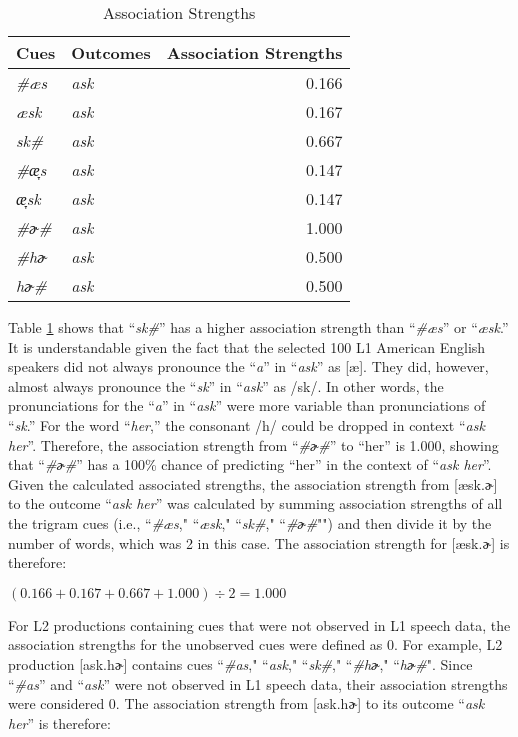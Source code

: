 \begin{table}[!h]
  \figSpace
  \centering
  \caption{Association Strengths}
    \begin{tabular}{llr}
 \toprule
    Cues & Outcomes  & Association Strengths \\
    \midrule
     \textit{\#æs}  & \textit{ask} & 0.166 \\
      \textit{æsk}  & \textit{ask} &0.167 \\
     \textit{sk\#}  & \textit{ask}&0.667 \\
     \textit{\#æ̞s} & \textit{ask} &0.147\\
     \textit{æ̞sk} & \textit{ask} &0.147\\
     \textit{\#ɚ\#}  & \textit{ask} & 1.000 \\
     \textit{\#hɚ}  & \textit{ask}&0.500 \\
     \textit{hɚ\#}  & \textit{ask} & 0.500 \\
    \bottomrule
    \end{tabular}%
  \label{tab:strength}%
    \figSpace
\end{table}%

Table \ref{tab:strength} shows that “\textit{sk\#}” has a higher association strength than “\textit{\#æs}” or “\textit{æsk}.” It is understandable given the fact that the selected 100 L1 American English speakers did not always pronounce the “\textit{a}” in “\textit{ask}” as [æ]. They did, however, almost always pronounce the “\textit{sk}” in “\textit{ask}” as /sk/. In other words, the pronunciations for the “\textit{a}” in “\textit{ask}” were more variable than pronunciations of “\textit{sk}.”  For the word “\textit{her},” the consonant /h/ could be dropped in context “\textit{ask her}”. Therefore, the association strength from “\textit{\#ɚ\#}” to “her” is 1.000, showing that “\textit{\#ɚ\#}” has a 100\% chance of predicting “her” in the context of “\textit{ask her}”. Given the calculated associated strengths, the association strength from [æsk.ɚ] to the outcome “\textit{ask her}” was calculated by summing association strengths of all the trigram cues (i.e., ``\textit{\#æs}," ``\textit{æsk}," ``\textit{sk\#}," ``\textit{\#ɚ\#}"") and then divide it by the number of words, which was 2 in this case. The association strength for [æsk.ɚ] is therefore:

$(0.166+0.167+0.667+1.000)\div 2 = 1.000 $

For L2 productions containing cues that were not observed in L1 speech data, the association strengths for the unobserved cues were defined as 0. For example, L2 production [ask.hɚ] contains cues ``\textit{\#as}," ``\textit{ask}," ``\textit{sk\#}," ``\textit{\#hɚ}," ``\textit{hɚ\#}". Since “\textit{\#as}” and “\textit{ask}” were not observed in L1 speech data, their association strengths were considered 0. The association strength from [ask.hɚ] to its outcome “\textit{ask her}” is therefore:

